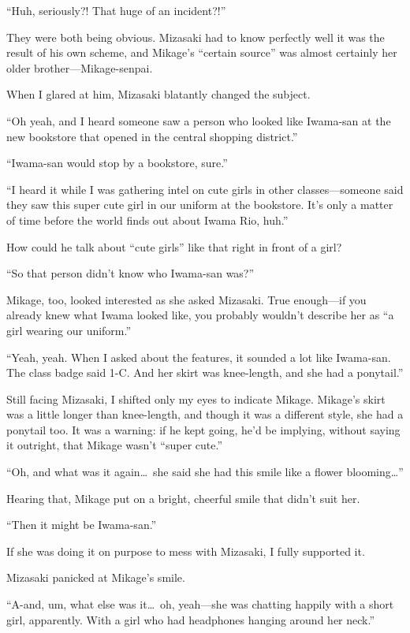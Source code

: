 \documentclass[
    a4paper,
    12pt,
    twoside,
    openany,
    UTF8,
    fontset=windows
]{ctexbook}
\begin{document}
``Huh, seriously?! That huge of an incident?!''

They were both being obvious. Mizasaki had to know perfectly well it was the result of his own scheme, and Mikage's ``certain source'' was almost certainly her older brother---Mikage-senpai.

When I glared at him, Mizasaki blatantly changed the subject.

``Oh yeah, and I heard someone saw a person who looked like Iwama-san at the new bookstore that opened in the central shopping district.''

``Iwama-san would stop by a bookstore, sure.''

``I heard it while I was gathering intel on cute girls in other classes---someone said they saw this super cute girl in our uniform at the bookstore. It's only a matter of time before the world finds out about Iwama Rio, huh.''

How could he talk about ``cute girls'' like that right in front of a girl?

``So that person didn't know who Iwama-san was?''

Mikage, too, looked interested as she asked Mizasaki. True enough---if you already knew what Iwama looked like, you probably wouldn't describe her as ``a girl wearing our uniform.''

``Yeah, yeah. When I asked about the features, it sounded a lot like Iwama-san. The class badge said 1-C. And her skirt was knee-length, and she had a ponytail.''

Still facing Mizasaki, I shifted only my eyes to indicate Mikage. Mikage's skirt was a little longer than knee-length, and though it was a different style, she had a ponytail too. It was a warning: if he kept going, he'd be implying, without saying it outright, that Mikage wasn't ``super cute.''

``Oh, and what was it again\dots\ she said she had this smile like a flower blooming\dots''

Hearing that, Mikage put on a bright, cheerful smile that didn't suit her.

``Then it might be Iwama-san.''

If she was doing it on purpose to mess with Mizasaki, I fully supported it.

Mizasaki panicked at Mikage's smile.

``A-and, um, what else was it\dots\ oh, yeah---she was chatting happily with a short girl, apparently. With a girl who had headphones hanging around her neck.''
\end{document}

